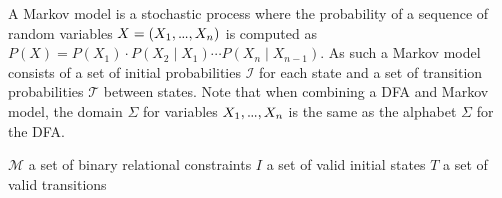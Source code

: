 \documentclass[phd,electronic,oneside,twosidetoc,letterpaper,chaptercenter,parttop,lol,lof,lot]{byumsphd}
\newcommand\mydots{\hbox to .75em{.\hss.\hss.}}
\begin{document}
A Markov model is a stochastic process where the probability of a sequence of random variables $X=(X_1,\mydots,X_n)$ is computed as $P(X)=P(X_1)\cdot P(X_2\mid X_1)\cdots P(X_n\mid X_{n-1})$. As such a Markov model consists of a set of initial probabilities $\mathcal{I}$ for each state and a set of transition probabilities $\mathcal{T}$ between states. Note that when combining a DFA and Markov model, the domain $\Sigma$ for variables $X_1,\mydots,X_n$ is the same as the alphabet $\Sigma$ for the DFA.
\newcommand{\gbfs}{\ensuremath{\mbox{\sc Relational Automaton}}}
\renewcommand{\algorithmicrequire}{\textbf{Data:}}
\renewcommand{\algorithmicensure}{\textbf{Result:}}
\begin{algorithm}[!b]
\caption{$\gbfs$}\label{alg:matching} 
\begin{algorithmic}
{}\newline
$\mathcal{M}$ a set of binary relational constraints \newline
$I$ a set of valid initial states \newline
$T$ a set of valid transitions


\end{algorithmic}
\end{algorithm}
\end{document}
